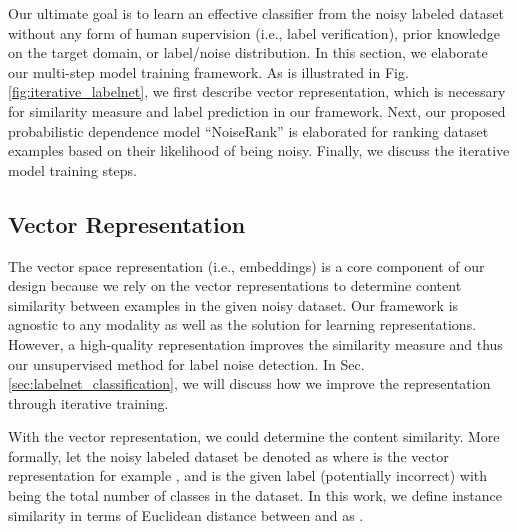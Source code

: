 Our ultimate goal is to learn an effective classifier from the noisy labeled dataset without any form of human supervision (i.e., label verification), prior knowledge on the target domain, or label/noise distribution. In this section, we elaborate our multi-step model training framework. As is illustrated in Fig. \ref{fig:iterative_labelnet}, we first describe vector representation, which is necessary for similarity measure and label prediction in our framework. Next, our proposed probabilistic dependence model ``NoiseRank'' is elaborated for ranking dataset examples based on their likelihood of being noisy. Finally, we discuss the iterative model training steps. 














\subsection{Vector Representation} \label{sec:rep_learning}

The vector space representation (i.e., embeddings) is a core component of our design because we rely on the vector representations to determine content similarity between examples in the given noisy dataset. Our framework is agnostic to any modality as well as the solution for learning representations. However, a high-quality representation improves the similarity measure and thus our unsupervised method for label noise detection. In Sec. \ref{sec:labelnet_classification}, we will discuss how we improve the representation through iterative training.

With the vector representation, we could determine the content similarity. More formally, let the noisy labeled dataset be denoted as  where  is the vector representation for example , and  is the given label (potentially incorrect) with  being the total number of classes in the dataset. In this work, we define instance similarity in terms of Euclidean distance between  and  as .






































